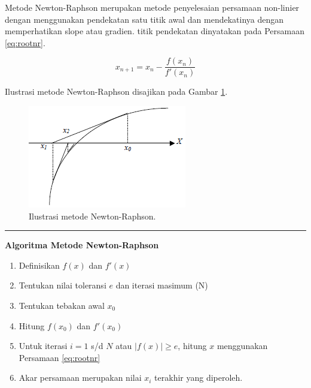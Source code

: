 \documentclass[
]{book}
\providecommand{\tightlist}{%
  \setlength{\itemsep}{0pt}\setlength{\parskip}{0pt}}
\theoremstyle{definition}
\theoremstyle{definition}
\theoremstyle{definition}
\theoremstyle{definition}
\theoremstyle{remark}
\begin{document}
Metode Newton-Raphson merupakan metode penyelesaian persamaan non-linier dengan menggunakan pendekatan satu titik awal dan mendekatinya dengan memperhatikan slope atau gradien. titik pendekatan dinyatakan pada Persamaan \eqref{eq:rootnr}.

\begin{equation}
x_{n+1}=x_n-\frac{f\left(x_n\right)}{f'\left(x_n\right)}
  \label{eq:rootnr}
\end{equation}

Ilustrasi metode Newton-Raphson disajikan pada Gambar \ref{fig:nrviz}.

\begin{figure}

{\centering \includegraphics[width=0.95\linewidth]{./images/nrviz} 

}

\caption{Ilustrasi metode Newton-Raphson.}\label{fig:nrviz}
\end{figure}

\begin{center}\rule{0.5\linewidth}{0.5pt}\end{center}

\textbf{Algoritma Metode Newton-Raphson}

\begin{enumerate}
\def\labelenumi{\arabic{enumi}.}
\tightlist
\item
  Definisikan \(f\left(x \right)\) dan \(f'\left(x \right)\)
\item
  Tentukan nilai toleransi \(e\) dan iterasi masimum (N)
\item
  Tentukan tebakan awal \(x_0\)
\item
  Hitung \(f\left(x_0 \right)\) dan \(f'\left(x_0 \right)\)
\item
  Untuk iterasi \(i=1\) s/d \(N\) atau \(\left|f\left(x \right) \right|\ge e\), hitung \(x\) menggunakan Persamaan \eqref{eq:rootnr}
\item
  Akar persamaan merupakan nilai \(x_i\) terakhir yang diperoleh.
\end{enumerate}
\end{document}
